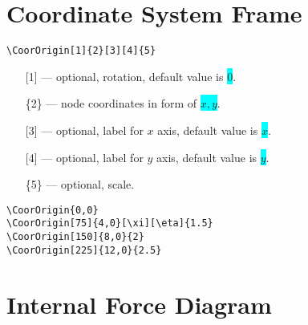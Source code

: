\documentclass[10pt,a4paper]{article}
\newcommand*{\Highlight}[1]{\colorbox{cyan}{\color{red}\texttt{#1}}}
\begin{document}
\section{Coordinate System Frame}
\begin{Verbatim}[frame=single,label=Syntax]
\CoorOrigin[1]{2}[3][4]{5}
\end{Verbatim}
\begin{enumerate}
\item[][1] --- optional, rotation, default value is \Highlight{$0$}.
\item[]\{2\} --- node coordinates in form of \Highlight{$x,y$}.
\item[][3] --- optional, label for $x$ axis, default value is \Highlight{$x$}.
\item[][4] --- optional, label for $y$ axis, default value is \Highlight{$y$}.
\item[]\{5\} --- optional, scale.
\end{enumerate}
\begin{Verbatim}[frame=single,label=Example]
\CoorOrigin{0,0}
\CoorOrigin[75]{4,0}[\xi][\eta]{1.5}
\CoorOrigin[150]{8,0}{2}
\CoorOrigin[225]{12,0}{2.5}
\end{Verbatim}
\begin{figure}[H]
\centering
{}
\end{figure}
\section{Internal Force Diagram}
\end{document}
